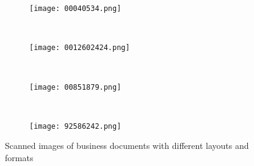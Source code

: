 \documentclass[sigconf]{acmart}
\begin{document}
\begin{figure*}[t]
\centering
    \begin{subfigure}[b]{0.25\textwidth}
        \texttt{[image: 00040534.png]}
        \caption{}
        \label{fig:1a}
    \end{subfigure}
    ~ \begin{subfigure}[b]{0.25\textwidth}
        \texttt{[image: 0012602424.png]}
        \caption{}
        \label{fig:1b}
    \end{subfigure}
    ~ \begin{subfigure}[b]{0.25\textwidth}
        \texttt{[image: 00851879.png]}
        \caption{}
        \label{fig:1c}
    \end{subfigure}
    ~
    \begin{subfigure}[b]{0.25\textwidth}
        \texttt{[image: 92586242.png]}
        \caption{}
        \label{fig:1d}
    \end{subfigure}
    \caption{Scanned images of business documents with different layouts and formats}\label{fig:1}
\end{figure*}
\end{document}
